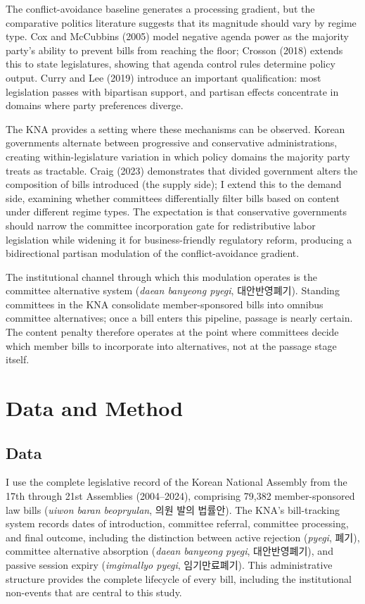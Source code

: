 \documentclass[11pt]{article}
\begin{document}
The conflict-avoidance baseline generates a processing gradient, but the comparative politics literature suggests that its magnitude should vary by regime type. Cox and McCubbins (2005) model negative agenda power as the majority party's ability to prevent bills from reaching the floor; Crosson (2018) extends this to state legislatures, showing that agenda control rules determine policy output. Curry and Lee (2019) introduce an important qualification: most legislation passes with bipartisan support, and partisan effects concentrate in domains where party preferences diverge.

The KNA provides a setting where these mechanisms can be observed. Korean governments alternate between progressive and conservative administrations, creating within-legislature variation in which policy domains the majority party treats as tractable. Craig (2023) demonstrates that divided government alters the composition of bills introduced (the supply side); I extend this to the demand side, examining whether committees differentially filter bills based on content under different regime types. The expectation is that conservative governments should narrow the committee incorporation gate for redistributive labor legislation while widening it for business-friendly regulatory reform, producing a bidirectional partisan modulation of the conflict-avoidance gradient.

The institutional channel through which this modulation operates is the committee alternative system (\textit{daean banyeong pyegi}, 대안반영폐기). Standing committees in the KNA consolidate member-sponsored bills into omnibus committee alternatives; once a bill enters this pipeline, passage is nearly certain. The content penalty therefore operates at the point where committees decide which member bills to incorporate into alternatives, not at the passage stage itself.


\section{Data and Method}
\label{sec:data}

\subsection{Data}

I use the complete legislative record of the Korean National Assembly from the 17th through 21st Assemblies (2004--2024), comprising 79,382 member-sponsored law bills (\textit{uiwon baran beopryulan}, 의원 발의 법률안). The KNA's bill-tracking system records dates of introduction, committee referral, committee processing, and final outcome, including the distinction between active rejection (\textit{pyegi}, 폐기), committee alternative absorption (\textit{daean banyeong pyegi}, 대안반영폐기), and passive session expiry (\textit{imgimallyo pyegi}, 임기만료폐기). This administrative structure provides the complete lifecycle of every bill, including the institutional non-events that are central to this study.
\end{document}
